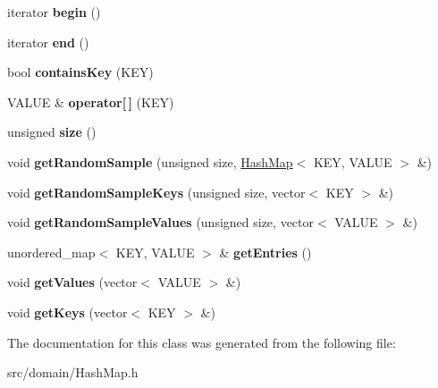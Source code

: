 \begin{DoxyCompactItemize}
\item 
\hypertarget{class_hash_map_a3b0a486bb4e801097ebb7fd40282a513}{}iterator {\bfseries begin} ()\label{class_hash_map_a3b0a486bb4e801097ebb7fd40282a513}

\item 
\hypertarget{class_hash_map_a37735a61fd58501770200671497f9388}{}iterator {\bfseries end} ()\label{class_hash_map_a37735a61fd58501770200671497f9388}

\item 
\hypertarget{class_hash_map_a7391f737a46c640dde378655e347727f}{}bool {\bfseries contains\+Key} (K\+E\+Y)\label{class_hash_map_a7391f737a46c640dde378655e347727f}

\item 
\hypertarget{class_hash_map_aaf70432c8b6cf09fb8024cd402d1bd7c}{}V\+A\+L\+U\+E \& {\bfseries operator\mbox{[}$\,$\mbox{]}} (K\+E\+Y)\label{class_hash_map_aaf70432c8b6cf09fb8024cd402d1bd7c}

\item 
\hypertarget{class_hash_map_ae29dc2b5b58f05690e455a51aeb7341d}{}unsigned {\bfseries size} ()\label{class_hash_map_ae29dc2b5b58f05690e455a51aeb7341d}

\item 
\hypertarget{class_hash_map_a830b182dc39eb42e7d0b47be33fa0ca6}{}void {\bfseries get\+Random\+Sample} (unsigned size, \hyperlink{class_hash_map}{Hash\+Map}$<$ K\+E\+Y, V\+A\+L\+U\+E $>$ \&)\label{class_hash_map_a830b182dc39eb42e7d0b47be33fa0ca6}

\item 
\hypertarget{class_hash_map_a1f7689504f9d0482326b1949e1fd17c5}{}void {\bfseries get\+Random\+Sample\+Keys} (unsigned size, vector$<$ K\+E\+Y $>$ \&)\label{class_hash_map_a1f7689504f9d0482326b1949e1fd17c5}

\item 
\hypertarget{class_hash_map_a2e9fdac639ddadbee08d4fcb5628f06e}{}void {\bfseries get\+Random\+Sample\+Values} (unsigned size, vector$<$ V\+A\+L\+U\+E $>$ \&)\label{class_hash_map_a2e9fdac639ddadbee08d4fcb5628f06e}

\item 
\hypertarget{class_hash_map_a68db9203d908598b70b8325194c54819}{}unordered\+\_\+map$<$ K\+E\+Y, V\+A\+L\+U\+E $>$ \& {\bfseries get\+Entries} ()\label{class_hash_map_a68db9203d908598b70b8325194c54819}

\item 
\hypertarget{class_hash_map_abc87b6932fa1319156a3d5fa9c46a446}{}void {\bfseries get\+Values} (vector$<$ V\+A\+L\+U\+E $>$ \&)\label{class_hash_map_abc87b6932fa1319156a3d5fa9c46a446}

\item 
\hypertarget{class_hash_map_ab7f911839bbe21bf582a8b69c9f500d1}{}void {\bfseries get\+Keys} (vector$<$ K\+E\+Y $>$ \&)\label{class_hash_map_ab7f911839bbe21bf582a8b69c9f500d1}

\end{DoxyCompactItemize}


The documentation for this class was generated from the following file\+:\begin{DoxyCompactItemize}
\item 
src/domain/Hash\+Map.\+h\end{DoxyCompactItemize}
